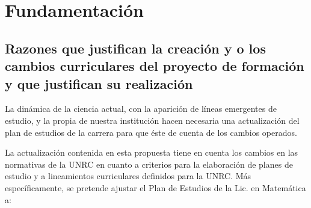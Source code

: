 \documentclass[a4paper, 12pt]{article}
\begin{document}
\section{Fundamentación}

\subsection{Razones que justifican la creación y o los cambios curriculares del proyecto de formación  y que justifican su realización}

La dinámica de la ciencia actual, con la aparición de líneas emergentes  de estudio,  y la propia  de nuestra institución hacen necesaria una actualización del plan de estudios de la carrera para que éste de cuenta de los cambios operados.   


La actualización  contenida en esta propuesta  tiene en cuenta los   cambios en las normativas de la UNRC en cuanto a criterios para la elaboración de  planes de estudio y a lineamientos curriculares definidos para la UNRC. Más específicamente, se pretende  ajustar el Plan de Estudios de la Lic. en Matemática a:
\end{document}
